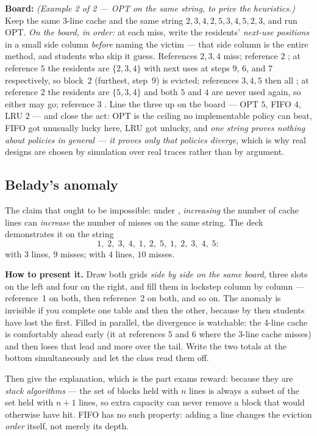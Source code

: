 \documentclass[11pt]{article}
\begin{document}
\textbf{Board:} \textit{(Example 2 of 2 --- OPT on the same string, to price the heuristics.)} Keep the same $3$-line cache and the same string $2,3,4,2,5,3,4,5,2,3$, and run OPT. \emph{On the board, in order:} at each miss, write the residents' \emph{next-use positions} in a small side column \emph{before} naming the victim --- that side column is the entire method, and students who skip it guess. References $2,3,4$ miss; reference $2$ ; at reference $5$ the residents are $\{2,3,4\}$ with next uses at steps $9$, $6$, and $7$ respectively, so block~$2$ (furthest, step~9) is evicted; references $3, 4, 5$ then all ; at reference $2$ the residents are $\{5,3,4\}$ and both $5$ and $4$ are never used again, so either may go; reference $3$ .  Line the three up on the board --- OPT $5$, FIFO $4$, LRU $2$ --- and close the act: OPT is the ceiling no implementable policy can beat, FIFO got unusually lucky here, LRU got unlucky, and \emph{one string proves nothing about policies in general --- it proves only that policies diverge}, which is why real designs are chosen by simulation over real traces rather than by argument.

\subsection*{Belady's anomaly}

The claim that ought to be impossible: under , \emph{increasing} the number of cache lines can \emph{increase} the number of misses on the same string. The deck demonstrates it on the string
\[ 1,\;2,\;3,\;4,\;1,\;2,\;5,\;1,\;2,\;3,\;4,\;5 : \]
with $3$ lines, $9$ misses; with $4$ lines, $10$ misses.

\textbf{How to present it.} Draw both grids \emph{side by side on the same board}, three slots on the left and four on the right, and fill them in lockstep column by column --- reference~1 on both, then reference~2 on both, and so on. The anomaly is invisible if you complete one table and then the other, because by then students have lost the first. Filled in parallel, the divergence is watchable: the 4-line cache is comfortably ahead early (it  at references $5$ and $6$ where the 3-line cache misses) and then loses that lead and more over the tail. Write the two totals at the bottom simultaneously and let the class read them off.

Then give the explanation, which is the part exams reward:  because they are \emph{stack algorithms} --- the set of blocks held with $n$ lines is always a subset of the set held with $n+1$ lines, so extra capacity can never remove a block that would otherwise have hit. FIFO has no such property: adding a line changes the eviction \emph{order} itself, not merely its depth.
\end{document}
